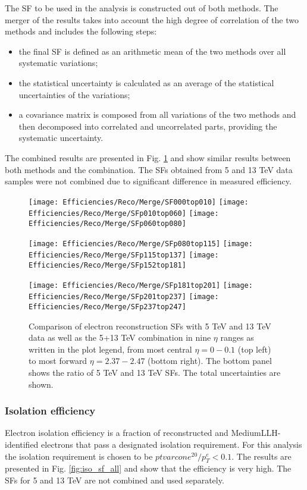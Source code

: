     The SF to be used in the analysis is constructed out of both methods. The merger of the results takes into account the high degree of correlation of the two methods and includes the following steps:
    \begin{itemize}
    	\item the final SF is defined as an arithmetic mean of the two methods over all systematic variations;
    	\item the statistical uncertainty is calculated as an average of the statistical uncertainties of the variations;
    	\item a covariance matrix is composed from all variations of the two methods and then decomposed into correlated and uncorrelated parts, providing the systematic uncertainty.
    \end{itemize}
    The combined results are presented in Fig. \ref{fig:reco_merge} and show similar results between both methods and the combination. The SFs obtained from 5 and 13 TeV data samples were not combined due to significant difference in measured efficiency.
    \begin{figure}[htbp]
    	\centering
    	\texttt{[image: Efficiencies/Reco/Merge/SF000top010]}%
    	\texttt{[image: Efficiencies/Reco/Merge/SFp010top060]}%
    	\texttt{[image: Efficiencies/Reco/Merge/SFp060top080]}
    	
    	\texttt{[image: Efficiencies/Reco/Merge/SFp080top115]}%
    	\texttt{[image: Efficiencies/Reco/Merge/SFp115top137]}%
    	\texttt{[image: Efficiencies/Reco/Merge/SFp152top181]}
    	
    	\texttt{[image: Efficiencies/Reco/Merge/SFp181top201]}%
    	\texttt{[image: Efficiencies/Reco/Merge/SFp201top237]}%
    	\texttt{[image: Efficiencies/Reco/Merge/SFp237top247]}
    	
    	\caption{Comparison of electron reconstruction SFs with 5 TeV and 13
    		TeV data as well as the 5+13 TeV combination in nine $\eta$ ranges
    		as written in the plot legend, from most central $\eta=0-0.1$ (top
    		left) to most forward $\eta=2.37-2.47$ (bottom right). The bottom panel shows the ratio
    		of 5 TeV and 13 TeV SFs. The total
    		uncertainties are shown.}  \label{fig:reco_merge}
    \end{figure}
    
    \subsubsection{Isolation efficiency}
    Electron isolation efficiency is a fraction of reconstructed and MediumLLH-identified electrons that pass a designated isolation requirement. For this analysis the isolation requirement is chosen to be $ptvarcone^{20}/p_T^e<0.1$. The results are presented in Fig. \ref{fig:iso_sf_all} and show that the efficiency is very high. The SFs for 5 and 13 TeV are not combined and used separately.
    
